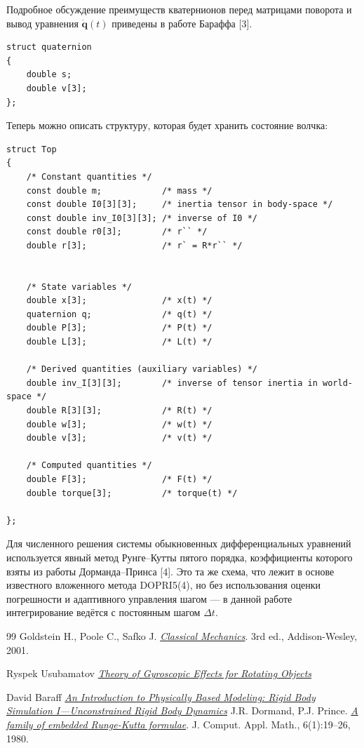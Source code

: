 \documentclass{article}
\begin{document}
Подробное обсуждение преимуществ кватернионов перед матрицами поворота 
и вывод уравнения $\dot{\mathbf{q}}(t)$ приведены в работе Бараффа [3].


\begin{verbatim}
struct quaternion
{
    double s;
    double v[3];
};
\end{verbatim}


Теперь можно описать структуру, которая будет хранить состояние волчка:
\begin{verbatim}
struct Top
{
    /* Constant quantities */
    const double m;            /* mass */
    const double I0[3][3];     /* inertia tensor in body-space */
    const double inv_I0[3][3]; /* inverse of I0 */
    const double r0[3];        /* r`` */
    double r[3];               /* r` = R*r`` */
    

    /* State variables */
    double x[3];               /* x(t) */
    quaternion q;              /* q(t) */
    double P[3];               /* P(t) */
    double L[3];               /* L(t) */

    /* Derived quantities (auxiliary variables) */
    double inv_I[3][3];        /* inverse of tensor inertia in world-space */
    double R[3][3];            /* R(t) */
    double w[3];               /* w(t) */
    double v[3];               /* v(t) */

    /* Computed quantities */
    double F[3];               /* F(t) */
    double torque[3];          /* torque(t) */

};
\end{verbatim}


Для численного решения системы обыкновенных дифференциальных уравнений используется явный метод 
Рунге–Кутты пятого порядка, коэффициенты которого взяты из работы 
Дорманда–Принса [4]. Это та же схема, что лежит в основе 
известного вложенного метода DOPRI5(4), но без использования оценки 
погрешности и адаптивного управления шагом — в данной работе интегрирование 
ведётся с постоянным шагом $\Delta t$.








\begin{thebibliography}{99}
 Goldstein H., Poole C., Safko J. \href{https://www.math.toronto.edu/khesin/biblio/GoldsteinPooleSafkoClassicalMechanics.pdf}{\textit{Classical Mechanics}}. 3rd ed., Addison-Wesley, 2001. 

Ryspek Usubamatov \href{https://link.springer.com/book/10.1007/978-3-030-99213-2}{\textit{Theory of Gyroscopic Effects for Rotating Objects}} 

David Baraff \href{https://www.cs.cmu.edu/~baraff/sigcourse/notesd1.pdf}{\textit{An Introduction to Physically Based Modeling:
Rigid Body Simulation I—Unconstrained Rigid Body
Dynamics}} 
J.R. Dormand, P.J. Prince.
\href{https://doi.org/10.1016/0771-050X(80)90013-3}{\textit{A family of embedded Runge-Kutta formulae}}.
J. Comput. Appl. Math., 6(1):19--26, 1980.



\end{thebibliography}
\end{document}
